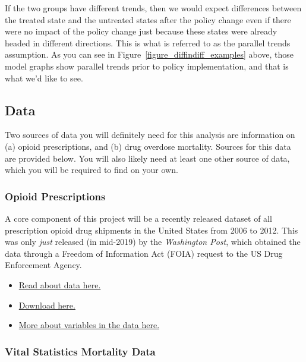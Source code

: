 \documentclass[12pt]{article}
\begin{document}
If the two groups have different trends, then we would expect differences between the treated state and the untreated states after the policy change even if there were no impact of the policy change just because these states were already headed in different directions.  This is what is referred to as the parallel trends assumption. As you can see in Figure~\ref{figure_diffindiff_examples} above, those model graphs show parallel trends prior to policy implementation, and that is what we'd like to see.



\subsection*{Data}

Two sources of data you will definitely need for this analysis are information on (a) opioid prescriptions, and (b) drug overdose mortality. Sources for this data are provided below. You will also likely need at least one other source of data, which you will be required to find on your own.

\subsubsection*{Opioid Prescriptions}

A core component of this project will be a recently released dataset of all prescription opioid drug shipments in the United States from 2006 to 2012. This was only \emph{just} released (in mid-2019) by the \emph{Washington Post}, which obtained the data through a Freedom of Information Act (FOIA) request to the US Drug Enforcement Agency.

\begin{itemize}
  \item \href{https://www.washingtonpost.com/graphics/2019/investigations/dea-pain-pill-database/}{Read about data here.}
  \item \href{https://www.washingtonpost.com/national/2019/07/18/how-download-use-dea-pain-pills-database/?arc404=true}{Download here.}
  \item \href{https://github.com/wpinvestigative/arcos-api/blob/master/data/data_dictionary.csv}{More about variables in the data here.}
\end{itemize}

\subsubsection*{Vital Statistics Mortality Data}
\end{document}
